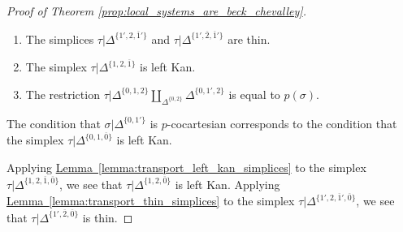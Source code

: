 \documentclass[main.tex]{subfiles}
\begin{document}
\begin{proof}[Proof of Theorem \ref{prop:local_systems_are_beck_chevalley}]
\begin{enumerate}
    \item The simplices $\tau|\Delta^{\{1',2,\overline{1}'\}}$ and $\tau|\Delta^{\{1',\overline{2},\overline{1}'\}}$ are thin.

    \item The simplex $\tau|\Delta^{\{1,2,\overline{1}\}}$ is left Kan.

    \item The restriction $\tau|\Delta^{\{0,1,2\}} \amalg_{\Delta^{\{0,2\}}}\Delta^{\{0,1',2\}}$ is equal to $p(\sigma)$.
  \end{enumerate}
  The condition that $\sigma|\Delta^{\{0, 1'\}}$ is $p$-cocartesian corresponds to the condition that the simplex $\tau|\Delta^{\{0,1,\overline{0}\}}$ is left Kan.

  Applying \hyperref[lemma:transport_left_kan_simplices]{Lemma~\ref*{lemma:transport_left_kan_simplices}} to the simplex $\tau|\Delta^{\{1,2,\overline{1}, \overline{0}\}}$, we see that $\tau|\Delta^{\{1,2,\overline{0}\}}$ is left Kan. Applying \hyperref[lemma:transport_thin_simplices]{Lemma~\ref*{lemma:transport_thin_simplices}} to the simplex $\tau|\Delta^{\{1',2, \overline{1}', \overline{0}\}}$, we see that $\tau|\Delta^{\{1',\overline{2}, \overline{0}\}}$ is thin.


\end{proof}
\end{document}
